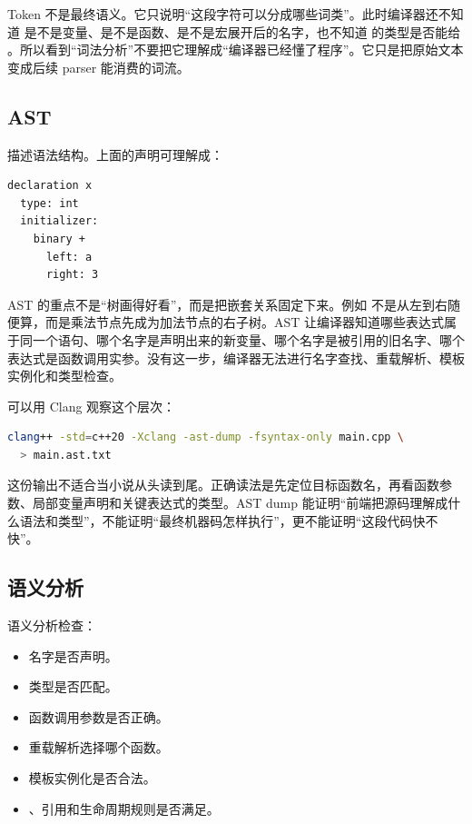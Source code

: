 Token 不是最终语义。它只说明“这段字符可以分成哪些词类”。此时编译器还不知道  是不是变量、是不是函数、是不是宏展开后的名字，也不知道  的类型是否能给 。所以看到“词法分析”不要把它理解成“编译器已经懂了程序”。它只是把原始文本变成后续 parser 能消费的词流。

\subsection{AST}

 描述语法结构。上面的声明可理解成：

\begin{center}
\begin{minipage}{0.68\linewidth}
\begin{verbatim}
declaration x
  type: int
  initializer:
    binary +
      left: a
      right: 3
\end{verbatim}
\end{minipage}
\end{center}

AST 的重点不是“树画得好看”，而是把嵌套关系固定下来。例如  不是从左到右随便算，而是乘法节点先成为加法节点的右子树。AST 让编译器知道哪些表达式属于同一个语句、哪个名字是声明出来的新变量、哪个名字是被引用的旧名字、哪个表达式是函数调用实参。没有这一步，编译器无法进行名字查找、重载解析、模板实例化和类型检查。

可以用 Clang 观察这个层次：

\begin{lstlisting}[language=bash,caption={观察前端语法和语义视角}]
clang++ -std=c++20 -Xclang -ast-dump -fsyntax-only main.cpp \
  > main.ast.txt
\end{lstlisting}

这份输出不适合当小说从头读到尾。正确读法是先定位目标函数名，再看函数参数、局部变量声明和关键表达式的类型。AST dump 能证明“前端把源码理解成什么语法和类型”，不能证明“最终机器码怎样执行”，更不能证明“这段代码快不快”。

\subsection{语义分析}

语义分析检查：

\begin{itemize}
  \item 名字是否声明。
  \item 类型是否匹配。
  \item 函数调用参数是否正确。
  \item 重载解析选择哪个函数。
  \item 模板实例化是否合法。
  \item {}、引用和生命周期规则是否满足。
\end{itemize}

